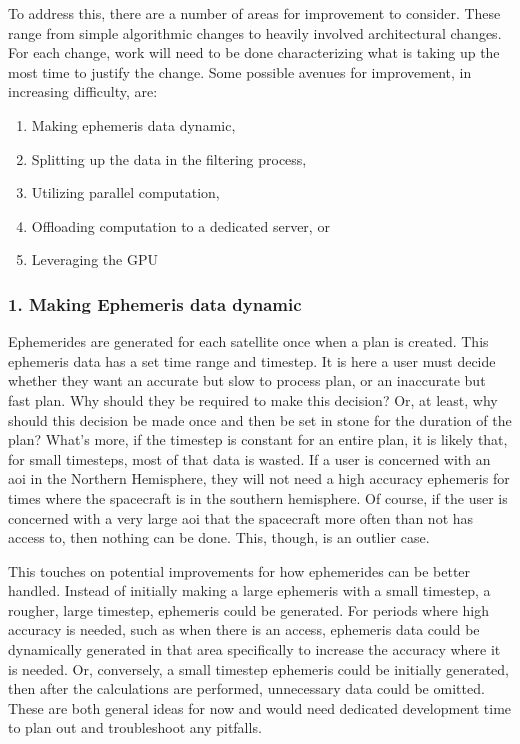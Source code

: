 To address this, there are a number of areas for improvement to consider.
These range from simple algorithmic changes to heavily involved architectural
changes. For each change, work will need to be done characterizing what is
taking up the most time to justify the change. Some possible avenues for
improvement, in increasing difficulty, are:

\begin{enumerate}
    \item Making ephemeris data dynamic,
    \item Splitting up the data in the filtering process,
    \item Utilizing parallel computation,
    \item Offloading computation to a dedicated server, or
    \item Leveraging the GPU
\end{enumerate}


\subsubsection{1. Making Ephemeris data dynamic}

Ephemerides are generated for each satellite once when a plan is created. This
ephemeris data has a set time range and timestep. It is here a user must decide
whether they want an accurate but slow to process plan, or an inaccurate but
fast plan. Why should they be required to make this decision? Or, at least, why
should this decision be made once and then be set in stone for the duration of
the plan? What's more, if the timestep is constant for an entire plan, it is
likely that, for small timesteps, most of that data is wasted. If a user is
concerned with an \gls{aoi} in the Northern Hemisphere, they will not need a
high accuracy ephemeris for times where the spacecraft is in the southern
hemisphere. Of course, if the user is concerned with a very large \gls{aoi}
that the spacecraft more often than not has access to, then nothing can be
done. This, though, is an outlier case.

This touches on potential improvements for how ephemerides can be better
handled.  Instead of initially making a large ephemeris with a small timestep,
a rougher, large timestep, ephemeris could be generated.  For periods where
high accuracy is needed, such as when there is an access, ephemeris data could
be dynamically generated in that area specifically to increase the accuracy
where it is needed. Or, conversely, a small timestep ephemeris could be
initially generated, then after the calculations are performed, unnecessary
data could be omitted. These are both general ideas for now and would need
dedicated development time to plan out and troubleshoot any pitfalls.

